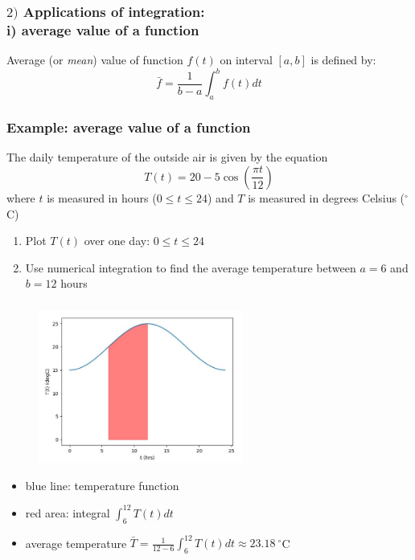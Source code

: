 \documentclass[english,14pt]{beamer}
\newcommand\red[1]{{\color{red} #1}}
\begin{document}
\begin{frame}[fragile]

\frametitle{$2)$ Applications of integration: \\ \qquad i) average value of a function}

Average (or \red{\emph{mean}}) value of function $f(t)$ on interval $[a,b]$ is defined by:
\[
\bar{f} = \frac{1}{b-a}\int_a^b f(t) dt
\]

\end{frame}


\begin{frame}[fragile]

\frametitle{Example: average value of a function}


The daily temperature of the outside air is given by the equation 
\[
T(t) = 20 - 5\cos\left( \frac{\pi t}{12} \right)
\]
where $t$ is measured in hours ($0 \leq t \leq 24$) and $T$ is measured in degrees Celsius ($^\circ$C)

\begin{enumerate}
	\item Plot $T(t)$ over one day: $0 \leq t \leq 24$
	\item Use numerical integration to find the average temperature between $a=6$ and $b=12$ hours
\end{enumerate}
 
 
\end{frame}


\begin{frame}[fragile]

\frametitle{}

\begin{figure}[ht]
	\centering
	\includegraphics[width=0.6\textwidth]{figures/avtempplot}
\end{figure}
\vspace*{-3mm}
\begin{itemize}
	\item blue line: temperature function
	\item red area: integral $\int_6^{12} T(t)dt$
	\item average temperature $\bar{T} = \frac{1}{12-6}\int_6^{12} T(t)dt \approx 23.18~^\circ$C
\end{itemize}

\end{frame}
\end{document}
